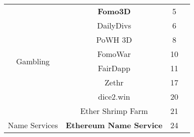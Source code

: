 \begin{table}[t]
\begin{tabular}{|c|c|c|l|}
					
\multirow{8}{*}{Gambling}										& \cellcolor{LightGrey} \textbf{Fomo3D} & 5 \\  
															& DailyDivs & 6 \\													& PoWH 3D & 8	 \\ 
															& FomoWar & 10 \\
															& FairDapp & 11\\
															& Zethr & 17 \\
															& dice2.win & 20 \\ 
															& Ether Shrimp Farm & 21 \\  \hline	

							
\multirow{1}{*}{Name Services}									& \cellcolor{LightGrey} \textbf{Ethereum Name Service} & 24  \\  \hline	
\end{tabular}
\vspace{1em}
\end{table}

